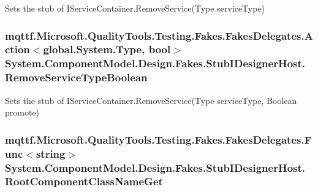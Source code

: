 Sets the stub of I\-Service\-Container.\-Remove\-Service(\-Type service\-Type)

\hypertarget{class_system_1_1_component_model_1_1_design_1_1_fakes_1_1_stub_i_designer_host_a0eddb2d74a63510b5e4fefe1d75ccbe1}{
\subsubsection[{Remove\-Service\-Type\-Boolean}]{\setlength{\rightskip}{0pt plus 5cm}mqttf.\-Microsoft.\-Quality\-Tools.\-Testing.\-Fakes.\-Fakes\-Delegates.\-Action$<$global.\-System.\-Type, bool$>$ System.\-Component\-Model.\-Design.\-Fakes.\-Stub\-I\-Designer\-Host.\-Remove\-Service\-Type\-Boolean}}\label{class_system_1_1_component_model_1_1_design_1_1_fakes_1_1_stub_i_designer_host_a0eddb2d74a63510b5e4fefe1d75ccbe1}


Sets the stub of I\-Service\-Container.\-Remove\-Service(\-Type service\-Type, Boolean promote)

\hypertarget{class_system_1_1_component_model_1_1_design_1_1_fakes_1_1_stub_i_designer_host_af25380b405a0c5861435ad7c9635c0f0}{
\subsubsection[{Root\-Component\-Class\-Name\-Get}]{\setlength{\rightskip}{0pt plus 5cm}mqttf.\-Microsoft.\-Quality\-Tools.\-Testing.\-Fakes.\-Fakes\-Delegates.\-Func$<$string$>$ System.\-Component\-Model.\-Design.\-Fakes.\-Stub\-I\-Designer\-Host.\-Root\-Component\-Class\-Name\-Get}}\label{class_system_1_1_component_model_1_1_design_1_1_fakes_1_1_stub_i_designer_host_af25380b405a0c5861435ad7c9635c0f0}


